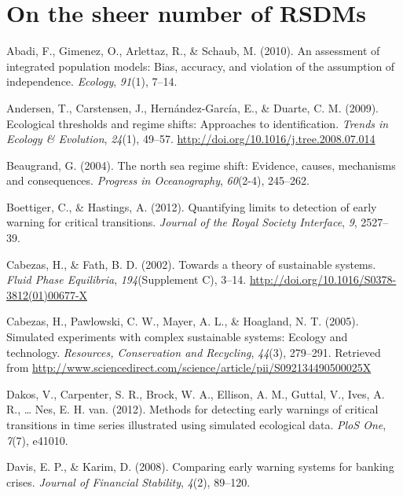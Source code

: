 \documentclass[12pt,twoside]{reedthesis}
\begin{document}
\hypertarget{on-the-sheer-number-of-rsdms}{%
\section{On the sheer number of RSDMs}\label{on-the-sheer-number-of-rsdms}}

\hypertarget{refs}{}
\leavevmode\hypertarget{ref-abadi2010assessment}{}%
Abadi, F., Gimenez, O., Arlettaz, R., \& Schaub, M. (2010). An assessment of integrated population models: Bias, accuracy, and violation of the assumption of independence. \emph{Ecology}, \emph{91}(1), 7--14.

\leavevmode\hypertarget{ref-andersen_ecological_2009}{}%
Andersen, T., Carstensen, J., Hernández-García, E., \& Duarte, C. M. (2009). Ecological thresholds and regime shifts: Approaches to identification. \emph{Trends in Ecology \& Evolution}, \emph{24}(1), 49--57. \url{http://doi.org/10.1016/j.tree.2008.07.014}

\leavevmode\hypertarget{ref-beaugrand2004north}{}%
Beaugrand, G. (2004). The north sea regime shift: Evidence, causes, mechanisms and consequences. \emph{Progress in Oceanography}, \emph{60}(2-4), 245--262.

\leavevmode\hypertarget{ref-boettiger_quantifying_2012}{}%
Boettiger, C., \& Hastings, A. (2012). Quantifying limits to detection of early warning for critical transitions. \emph{Journal of the Royal Society Interface}, \emph{9}, 2527--39.

\leavevmode\hypertarget{ref-cabezas_towards_2002}{}%
Cabezas, H., \& Fath, B. D. (2002). Towards a theory of sustainable systems. \emph{Fluid Phase Equilibria}, \emph{194}(Supplement C), 3--14. \url{http://doi.org/10.1016/S0378-3812(01)00677-X}

\leavevmode\hypertarget{ref-cabezas_simulated_2005}{}%
Cabezas, H., Pawlowski, C. W., Mayer, A. L., \& Hoagland, N. T. (2005). Simulated experiments with complex sustainable systems: Ecology and technology. \emph{Resources, Conservation and Recycling}, \emph{44}(3), 279--291. Retrieved from \url{http://www.sciencedirect.com/science/article/pii/S092134490500025X}

\leavevmode\hypertarget{ref-dakos_methods_2012}{}%
Dakos, V., Carpenter, S. R., Brock, W. A., Ellison, A. M., Guttal, V., Ives, A. R., \ldots{} Nes, E. H. van. (2012). Methods for detecting early warnings of critical transitions in time series illustrated using simulated ecological data. \emph{PloS One}, \emph{7}(7), e41010.

\leavevmode\hypertarget{ref-davis_comparing_2008}{}%
Davis, E. P., \& Karim, D. (2008). Comparing early warning systems for banking crises. \emph{Journal of Financial Stability}, \emph{4}(2), 89--120.
\end{document}
